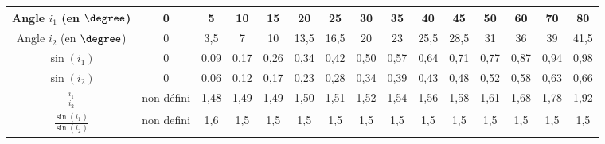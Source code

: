\begin{center}
    \begin{tabular}{|C{0.1}|C{0.04}|C{0.04}|C{0.04}|C{0.04}|C{0.04}|C{0.04}|C{0.04}|C{0.04}|C{0.04}|C{0.04}|C{0.04}|C{0.04}|C{0.04}|C{0.04}|}
    \hline
        Angle $i_1$ (en $\degree$) & 0 & 5 & 10 & 15 & 20 & 25 & 30 & 35 & 40 & 45 & 50 & 60 & 70 & 80 \\
        \hline
        Angle $i_2$ (en $\degree$) & 0 & 3,5 & 7 & 10 & 13,5  & 16,5 & 20 & 23 & 25,5 & 28,5 & 31 & 36 & 39 & 41,5    \\
        \hline
        $\sin\left(i_1\right)$ & 0 & 0,09 & 0,17 & 0,26 & 0,34  & 0,42  & 0,50 & 0,57 & 0,64 & 0,71 & 0,77 & 0,87 & 0,94  & 0,98 \\
        \hline
        $\sin\left(i_2\right)$ & 0 & 0,06 & 0,12 & 0,17  & 0,23  & 0,28 & 0,34 & 0,39  & 0,43 & 0,48  & 0,52 & 0,58  & 0,63 & 0,66 \\
        \hline
        $\frac{i_1}{i_2}$ & non défini & 1,48 & 1,49 & 1,49 & 1,50 & 1,51 & 1,52 & 1,54 & 1,56 & 1,58 & 1,61 & 1,68 & 1,78 & 1,92  \\
        \hline
       $\frac{\sin\left(i_1\right)}{\sin\left(i_2\right)}$ & non defini & 1,6 & 1,5 & 1,5 & 1,5 & 1,5  & 1,5 &1,5  &1,5  &  1,5& 1,5 & 1,5  & 1,5 & 1,5  \\
        \hline
    \end{tabular}
\end{center}

